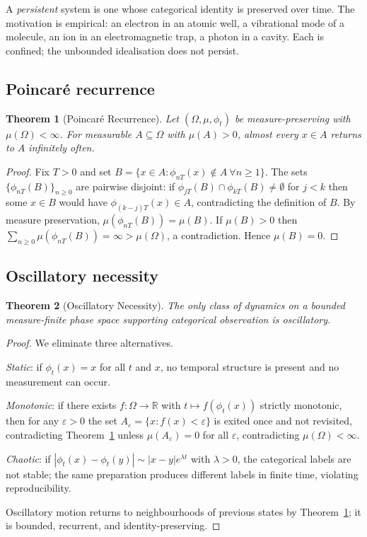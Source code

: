 \documentclass[twocolumn,10pt,a4paper]{article}
\theoremstyle{thmstyle}
\newtheorem{theorem}{Theorem}[section]
\theoremstyle{definition}
\theoremstyle{remark}
\newcommand{\R}{\mathbb{R}}
\begin{document}
A \emph{persistent} system is one whose categorical identity is
preserved over time. The motivation is empirical: an electron in an
atomic well, a vibrational mode of a molecule, an ion in an
electromagnetic trap, a photon in a cavity. Each is confined; the
unbounded idealisation does not persist.

\subsection{Poincar\'{e} recurrence}

\begin{theorem}[Poincar\'{e} Recurrence]
\label{thm:poincare}
Let $(\Omega,\mu,\phi_{t})$ be measure-preserving with
$\mu(\Omega)<\infty$. For measurable $A\subseteq\Omega$ with
$\mu(A)>0$, almost every $x\in A$ returns to $A$ infinitely often.
\end{theorem}

\begin{proof}
Fix $T>0$ and set $B=\{x\in A:\phi_{nT}(x)\notin A\ \forall n\geq 1\}$.
The sets $\{\phi_{nT}(B)\}_{n\geq 0}$ are pairwise disjoint: if
$\phi_{jT}(B)\cap\phi_{kT}(B)\neq\emptyset$ for $j<k$ then some
$x\in B$ would have $\phi_{(k-j)T}(x)\in A$, contradicting the
definition of $B$. By measure preservation,
$\mu(\phi_{nT}(B))=\mu(B)$. If $\mu(B)>0$ then
$\sum_{n\geq 0}\mu(\phi_{nT}(B))=\infty>\mu(\Omega)$, a contradiction.
Hence $\mu(B)=0$.
\end{proof}

\subsection{Oscillatory necessity}

\begin{theorem}[Oscillatory Necessity]
\label{thm:osc}
The only class of dynamics on a bounded measure-finite phase space
supporting categorical observation is oscillatory.
\end{theorem}

\begin{proof}
We eliminate three alternatives.

\emph{Static}: if $\phi_{t}(x)=x$ for all $t$ and $x$, no temporal
structure is present and no measurement can occur.

\emph{Monotonic}: if there exists $f:\Omega\to\R$ with
$t\mapsto f(\phi_{t}(x))$ strictly monotonic, then for any
$\varepsilon>0$ the set $A_{\varepsilon}=\{x:f(x)<\varepsilon\}$ is
exited once and not revisited, contradicting
Theorem~\ref{thm:poincare} unless $\mu(A_{\varepsilon})=0$ for all
$\varepsilon$, contradicting $\mu(\Omega)<\infty$.

\emph{Chaotic}: if
$|\phi_{t}(x)-\phi_{t}(y)|\sim|x-y|e^{\lambda t}$ with $\lambda>0$,
the categorical labels are not stable; the same preparation produces
different labels in finite time, violating reproducibility.

Oscillatory motion returns to neighbourhoods of previous states by
Theorem~\ref{thm:poincare}; it is bounded, recurrent, and
identity-preserving.
\end{proof}
\end{document}
